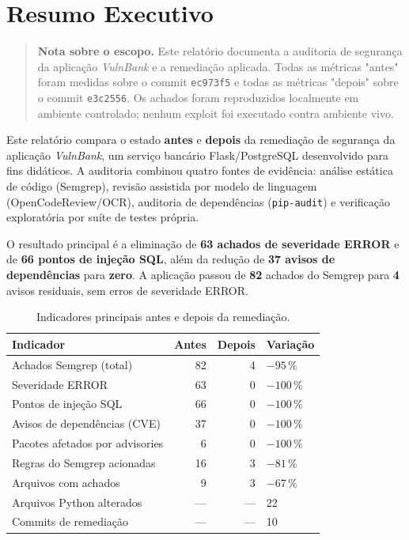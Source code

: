 \documentclass[12pt,a4paper]{article}
\begin{document}
\ClearShipoutPictureBG

\tableofcontents
\newpage

\section{Resumo Executivo}

\begin{quote}
\small\color{gray}
\textbf{Nota sobre o escopo.} Este relatório documenta a auditoria de segurança
da aplicação \textit{VulnBank} e a remediação aplicada. Todas as métricas
"antes" foram medidas sobre o commit \texttt{ec973f5} e todas as métricas
"depois" sobre o commit \texttt{e3c2556}. Os achados foram reproduzidos
localmente em ambiente controlado; nenhum exploit foi executado contra
ambiente vivo.
\end{quote}

Este relatório compara o estado \textbf{antes} e \textbf{depois} da remediação de
segurança da aplicação \textit{VulnBank}, um serviço bancário Flask/PostgreSQL
desenvolvido para fins didáticos. A auditoria combinou quatro fontes de
evidência: análise estática de código (Semgrep), revisão assistida por modelo
de linguagem (OpenCodeReview/OCR), auditoria de dependências (\texttt{pip-audit})
e verificação exploratória por suíte de testes própria.

O resultado principal é a eliminação de \textbf{63 achados de severidade
\textsc{ERROR}} e de \textbf{66 pontos de injeção SQL}, além da redução de
\textbf{37 avisos de dependências} para \textbf{zero}. A aplicação passou de
\textbf{82} achados do Semgrep para \textbf{4} avisos residuais, sem erros de
 severidade \textsc{ERROR}.

\begin{table}[H]
\centering
\caption{Indicadores principais antes e depois da remediação.}
\begin{tabularx}{\textwidth}{@{}XrrX@{}}
\toprule
\textbf{Indicador} & \textbf{Antes} & \textbf{Depois} & \textbf{Variação} \\
\midrule
Achados Semgrep (total)          & 82  & 4  & $-95\,\%$ \\
Severidade \textsc{ERROR}        & 63  & 0  & $-100\,\%$ \\
Pontos de injeção SQL             & 66  & 0  & $-100\,\%$ \\
Avisos de dependências (CVE)     & 37  & 0  & $-100\,\%$ \\
Pacotes afetados por advisories   & 6   & 0  & $-100\,\%$ \\
Regras do Semgrep acionadas       & 16  & 3  & $-81\,\%$ \\
Arquivos com achados              & 9   & 3  & $-67\,\%$ \\
Arquivos Python alterados         & --- & --- & 22 \\
Commits de remediação             & --- & --- & 10 \\
\bottomrule
\end{tabularx}
\end{table}
\end{document}
